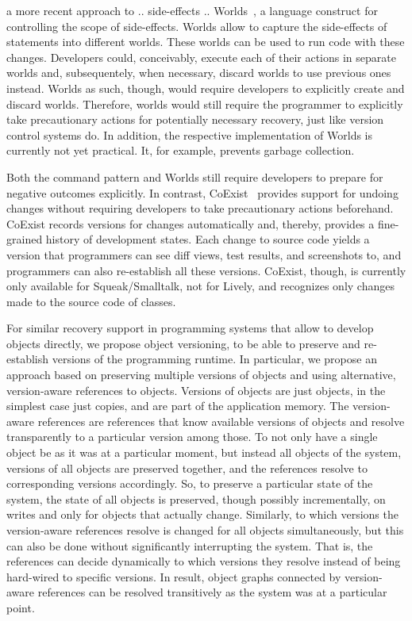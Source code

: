 a more recent approach to .. side-effects .. Worlds~\cite{Warth2011Wor}, a language construct for controlling the scope of side-effects. Worlds allow to capture the side-effects of statements into different worlds. These worlds can be used to run code with these changes. Developers could, conceivably, execute each of their actions in separate worlds and, subsequentely, when necessary, discard worlds to use previous ones instead. Worlds as such, though, would require developers to explicitly create and discard worlds. Therefore, worlds would still require the programmer to explicitly take precautionary actions for potentially necessary recovery, just like version control systems do. In addition, the respective implementation of Worlds is currently not yet practical. It, for example, prevents garbage collection.

Both the command pattern and Worlds still require developers to prepare for negative outcomes explicitly.
In contrast, CoExist~\cite{Steinert2012COE} provides support for undoing changes without requiring developers to take precautionary actions beforehand.
CoExist records versions for changes automatically and, thereby, provides a fine-grained history of development states.
Each change to source code yields a version that programmers can see diff views, test results, and screenshots to, and programmers can also re-establish all these versions. 
CoExist, though, is currently only available for Squeak/Smalltalk, not for Lively, and recognizes only changes made to the source code of classes.

For similar recovery support in programming systems that allow to develop objects directly, we propose object versioning, to be able to preserve and re-establish versions of the programming runtime.
In particular, we propose an approach based on preserving multiple versions of objects and using alternative, version-aware references to objects.
Versions of objects are just objects, in the simplest case just copies, and are part of the application memory.
The version-aware references are references that know available versions of objects and resolve transparently to a particular version among those.
To not only have a single object be as it was at a particular moment, but instead all objects of the system, versions of all objects are preserved together, and the references resolve to corresponding versions accordingly.
So, to preserve a particular state of the system, the state of all objects is preserved, though possibly incrementally, on writes and only for objects that actually change.
Similarly, to which versions the version-aware references resolve is changed for all objects simultaneously, but this can also be done without significantly interrupting the system.
That is, the references can decide dynamically to which versions they resolve instead of being hard-wired to specific versions.
In result, object graphs connected by version-aware references can be resolved transitively as the system was at a particular point.

